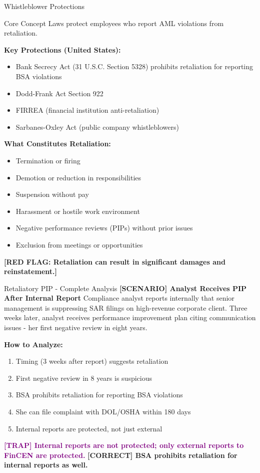 \documentclass[11pt,a4paper]{beamer}
\newcommand{\trap}[1]{\textcolor{purple}{\textbf{[TRAP] #1}}}
\newcommand{\correct}[1]{\textcolor{green!50!black}{\textbf{[CORRECT] #1}}}
\newcommand{\scenario}[1]{\textcolor{blue!70!black}{\textbf{[SCENARIO] #1}}}
\newcommand{\redflag}[1]{\textcolor{red!80!black}{\textbf{[RED FLAG: #1]}}}
\begin{document}
	\begin{frame}{Whistleblower Protections}
		\begin{block}{Core Concept}
			Laws protect employees who report AML violations from retaliation.
		\end{block}
		\textbf{Key Protections (United States):}
		\begin{itemize}
			\item Bank Secrecy Act (31 U.S.C. Section 5328) prohibits retaliation for reporting BSA violations
			\item Dodd-Frank Act Section 922
			\item FIRREA (financial institution anti-retaliation)
			\item Sarbanes-Oxley Act (public company whistleblowers)
		\end{itemize}
		\textbf{What Constitutes Retaliation:}
		\begin{itemize}
			\item Termination or firing
			\item Demotion or reduction in responsibilities
			\item Suspension without pay
			\item Harassment or hostile work environment
			\item Negative performance reviews (PIPs) without prior issues
			\item Exclusion from meetings or opportunities
		\end{itemize}
		\redflag{Retaliation can result in significant damages and reinstatement.}
	\end{frame}
	
	\begin{frame}{Retaliatory PIP - Complete Analysis}
		\scenario{Analyst Receives PIP After Internal Report}
		Compliance analyst reports internally that senior management is suppressing SAR filings on high-revenue corporate client. Three weeks later, analyst receives performance improvement plan citing communication issues - her first negative review in eight years.
		
		\vspace{0.1cm}
		\textbf{How to Analyze:}
		\begin{enumerate}
			\item Timing (3 weeks after report) suggests retaliation
			\item First negative review in 8 years is suspicious
			\item BSA prohibits retaliation for reporting BSA violations
			\item She can file complaint with DOL/OSHA within 180 days
			\item Internal reports are protected, not just external
		\end{enumerate}
		\trap{Internal reports are not protected; only external reports to FinCEN are protected.}
		\correct{BSA prohibits retaliation for internal reports as well.}
	\end{frame}
	
\end{document}
